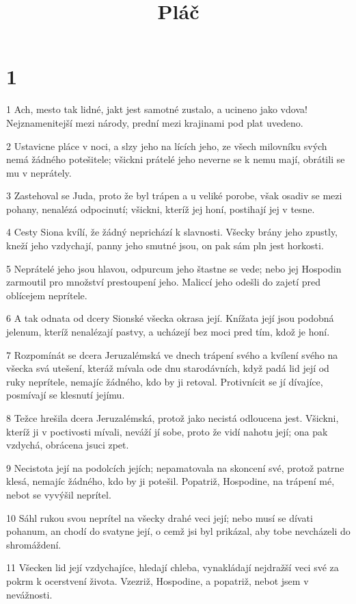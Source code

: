 

\title{Pláč}

\chapter{1}

\par 1 Ach, mesto tak lidné, jakt jest samotné zustalo, a ucineno jako vdova! Nejznamenitejší mezi národy, prední mezi krajinami pod plat uvedeno.
\par 2 Ustavicne pláce v noci, a slzy jeho na lících jeho, ze všech milovníku svých nemá žádného potešitele; všickni prátelé jeho neverne se k nemu mají, obrátili se mu v neprátely.
\par 3 Zastehoval se Juda, proto že byl trápen a u veliké porobe, však osadiv se mezi pohany, nenalézá odpocinutí; všickni, kteríž jej honí, postihají jej v tesne.
\par 4 Cesty Siona kvílí, že žádný neprichází k slavnosti. Všecky brány jeho zpustly, kneží jeho vzdychají, panny jeho smutné jsou, on pak sám pln jest horkosti.
\par 5 Neprátelé jeho jsou hlavou, odpurcum jeho štastne se vede; nebo jej Hospodin zarmoutil pro množství prestoupení jeho. Maliccí jeho odešli do zajetí pred oblícejem neprítele.
\par 6 A tak odnata od dcery Sionské všecka okrasa její. Knížata její jsou podobná jelenum, kteríž nenalézají pastvy, a ucházejí bez moci pred tím, kdož je honí.
\par 7 Rozpomínát se dcera Jeruzalémská ve dnech trápení svého a kvílení svého na všecka svá utešení, kteráž mívala ode dnu starodávních, když padá lid její od ruky neprítele, nemajíc žádného, kdo by ji retoval. Protivnícit se jí dívajíce, posmívají se klesnutí jejímu.
\par 8 Težce hrešila dcera Jeruzalémská, protož jako necistá odloucena jest. Všickni, kteríž ji v poctivosti mívali, neváží jí sobe, proto že vidí nahotu její; ona pak vzdychá, obrácena jsuci zpet.
\par 9 Necistota její na podolcích jejích; nepamatovala na skoncení své, protož patrne klesá, nemajíc žádného, kdo by ji potešil. Popatriž, Hospodine, na trápení mé, nebot se vyvýšil neprítel.
\par 10 Sáhl rukou svou neprítel na všecky drahé veci její; nebo musí se dívati pohanum, an chodí do svatyne její, o cemž jsi byl prikázal, aby tobe nevcházeli do shromáždení.
\par 11 Všecken lid její vzdychajíce, hledají chleba, vynakládají nejdražší veci své za pokrm k ocerstvení života. Vzezriž, Hospodine, a popatriž, nebot jsem v nevážnosti.
